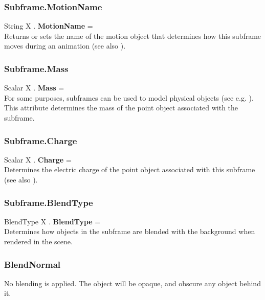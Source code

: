 \subsubsection{Subframe.MotionName \label{F:Subframe:MotionName}}
String X . \textbf{MotionName} = \\
Returns or sets the name of the motion object that determines how this subframe moves during an animation (see also ).

\subsubsection{Subframe.Mass \label{F:Subframe:Mass}}
Scalar X . \textbf{Mass} = \\
For some purposes, subframes can be used to model physical objects (see e.g. ). This attribute determines the mass of the point object associated with the subframe.

\subsubsection{Subframe.Charge \label{F:Subframe:Charge}}
Scalar X . \textbf{Charge} = \\
Determines the electric charge of the point object associated with this subframe (see also ).

\subsubsection{Subframe.BlendType \label{F:Subframe:BlendType}}
BlendType X . \textbf{BlendType} = \\
Determines how objects in the subframe are blended with the background when rendered in the scene.


\subsubsection{BlendNormal \label{T:BlendType|BlendNormal}}
No blending is applied. The object will be opaque, and obscure any object behind it.

